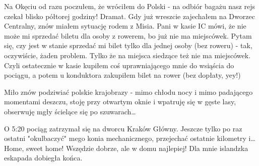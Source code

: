 Na Okęciu od razu poczułem, że wróciłem do Polski - na odbiór bagażu nasz rejs czekał blisko półtorej godziny! Dramat. Gdy już wreszcie zajechałem na Dworzec Centralny, znów miałem sytuację rodem z Misia. Pani w kasie IC mówi, że nie może mi sprzedać biletu dla osoby z rowerem, bo już nie ma miejscówek. Pytam się, czy jest w stanie sprzedać mi bilet tylko dla jednej osoby (bez roweru) - tak, oczywiście, żaden problem. Tylko że na miejsca siedzące też nie ma miejscówek. Czyli ostatecznie w kasie kupiłem coś uprawniającego mnie do wsiąścia do pociągu, a potem u konduktora zakupiłem bilet na rower (bez dopłaty, yey!)

Miło znów podziwiać polskie krajobrazy - mimo chłodu nocy i mimo padającego momentami deszczu, stoję przy otwartym oknie i wpatruję się w gęste lasy, obserwuję mgły ścielące się po szuwarach…

O 5:20 pociąg zatrzymał się na dworcu Kraków Główny. Jeszcze tylko po raz ostatni "okulbaczyć" mego konia mechanicznego, przejechać ostatnie kilometry i… Home, sweet home! Wszędzie dobrze, ale w domu najlepiej! Dla mnie islandzka eskapada dobiegła końca.


